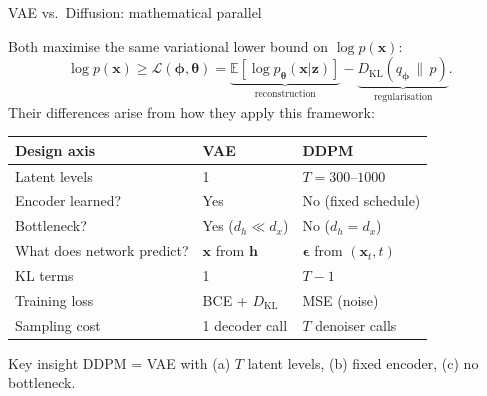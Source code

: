 \documentclass[aspectratio=169,11pt]{beamer}
\newcommand{\E}{\mathbb{E}}
\newcommand{\DKL}{D_{\mathrm{KL}}}
\newcommand{\ELBO}{\mathcal{L}}
\newcommand{\bx}{\bm{x}}
\newcommand{\bh}{\bm{h}}
\newcommand{\bz}{\bm{z}}
\newcommand{\beps}{\bm{\epsilon}}
\newcommand{\btheta}{\bm{\theta}}
\newcommand{\bphi}{\bm{\phi}}
\begin{document}
\begin{frame}{VAE vs.\ Diffusion: mathematical parallel}

Both maximise the same variational lower bound on $\log p(\bx)$:
\[
  \log p(\bx) \geq \ELBO(\bphi,\btheta)
  = \underbrace{\E[\log p_{\btheta}(\bx|\bz)]}_{\text{reconstruction}}
  - \underbrace{\DKL(q_{\bphi}\,\|\,p)}_{\text{regularisation}}.
\]
Their differences arise from how they apply this framework:

\begin{center}
\renewcommand{\arraystretch}{1.3}
\begin{tabular}{lll}
\toprule
\textbf{Design axis} & \textbf{VAE} & \textbf{DDPM}\\
\midrule
Latent levels         & 1            & $T = 300$--$1000$\\
Encoder learned?      & Yes          & No (fixed schedule)\\
Bottleneck?           & Yes ($d_h\ll d_x$) & No ($d_h = d_x$)\\
What does network predict? & $\bx$ from $\bh$ & $\beps$ from $(\bx_t,t)$\\
KL terms              & 1            & $T-1$\\
Training loss         & BCE + $\DKL$ & MSE (noise)\\
Sampling cost         & 1 decoder call & $T$ denoiser calls\\
\bottomrule
\end{tabular}
\end{center}

\begin{block}{Key insight}
DDPM = VAE with (a) $T$ latent levels, (b) fixed encoder, (c) no bottleneck.
\end{block}
\end{frame}
\end{document}
